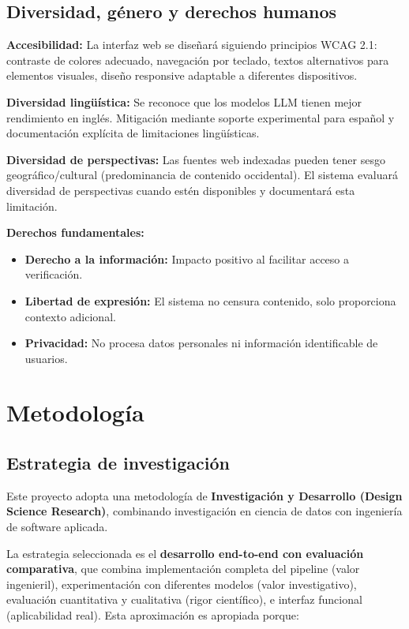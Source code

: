 \documentclass[12pt,a4paper]{article}
\begin{document}
\subsection{Diversidad, género y derechos humanos}

\textbf{Accesibilidad:} La interfaz web se diseñará siguiendo principios WCAG 2.1: contraste de colores adecuado, navegación por teclado, textos alternativos para elementos visuales, diseño responsive adaptable a diferentes dispositivos.

\textbf{Diversidad lingüística:} Se reconoce que los modelos LLM tienen mejor rendimiento en inglés. Mitigación mediante soporte experimental para español y documentación explícita de limitaciones lingüísticas.

\textbf{Diversidad de perspectivas:} Las fuentes web indexadas pueden tener sesgo geográfico/cultural (predominancia de contenido occidental). El sistema evaluará diversidad de perspectivas cuando estén disponibles y documentará esta limitación.

\textbf{Derechos fundamentales:}
\begin{itemize}
    \item \textbf{Derecho a la información:} Impacto positivo al facilitar acceso a verificación.
    \item \textbf{Libertad de expresión:} El sistema no censura contenido, solo proporciona contexto adicional.
    \item \textbf{Privacidad:} No procesa datos personales ni información identificable de usuarios.
\end{itemize}

\section{Metodología}

\subsection{Estrategia de investigación}

Este proyecto adopta una metodología de \textbf{Investigación y Desarrollo (Design Science Research)}, combinando investigación en ciencia de datos con ingeniería de software aplicada.

La estrategia seleccionada es el \textbf{desarrollo end-to-end con evaluación comparativa}, que combina implementación completa del pipeline (valor ingenieril), experimentación con diferentes modelos (valor investigativo), evaluación cuantitativa y cualitativa (rigor científico), e interfaz funcional (aplicabilidad real). Esta aproximación es apropiada porque:
\end{document}
